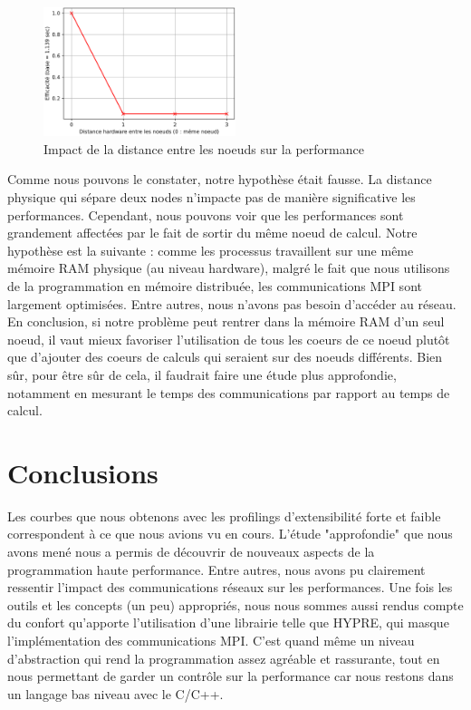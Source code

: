\documentclass[10pt,twocolumn,letterpaper]{article}
\begin{document}
\begin{figure}[H]
    \centering
    \caption{Impact de la distance entre les noeuds sur la performance}
    \includegraphics[width=0.50\textwidth]{fig/dist_profiling.png}
  \end{figure}

Comme nous pouvons le constater, notre hypothèse était fausse. La distance
physique qui sépare deux nodes n'impacte pas de manière significative les
performances. Cependant, nous pouvons voir que les performances sont
grandement affectées par le fait de sortir du même noeud de calcul.
Notre hypothèse est la suivante : comme les processus travaillent sur une
même mémoire RAM physique (au niveau hardware), malgré le fait que nous
utilisons de la programmation en mémoire distribuée, les communications MPI
sont largement optimisées. Entre autres, nous n'avons pas besoin d'accéder
au réseau. En conclusion, si notre problème peut rentrer dans la mémoire RAM
d'un seul noeud, il vaut mieux favoriser l'utilisation de tous les coeurs de
ce noeud plutôt que d'ajouter des coeurs de calculs qui seraient sur des noeuds
différents. Bien sûr, pour être sûr de cela, il faudrait faire une étude plus
approfondie, notamment en mesurant le temps des communications par rapport au
temps de calcul.

\section*{Conclusions}

Les courbes que nous obtenons avec les profilings d'extensibilité forte et
faible correspondent à ce que nous avions vu en cours.
L'étude "approfondie"
que nous avons mené nous a permis de découvrir de nouveaux aspects de la
programmation haute performance. Entre autres, nous avons pu clairement
ressentir l'impact des communications réseaux sur les performances.
Une fois les outils et les concepts (un peu) appropriés, nous nous sommes aussi
rendus compte du confort qu'apporte l'utilisation
d'une librairie telle que HYPRE,
qui masque l'implémentation des communications MPI. C'est quand même un niveau
d'abstraction qui rend la programmation assez agréable et rassurante, tout en
nous permettant de garder un contrôle sur la performance
car nous restons dans un langage bas niveau avec le C/C++.
\end{document}
